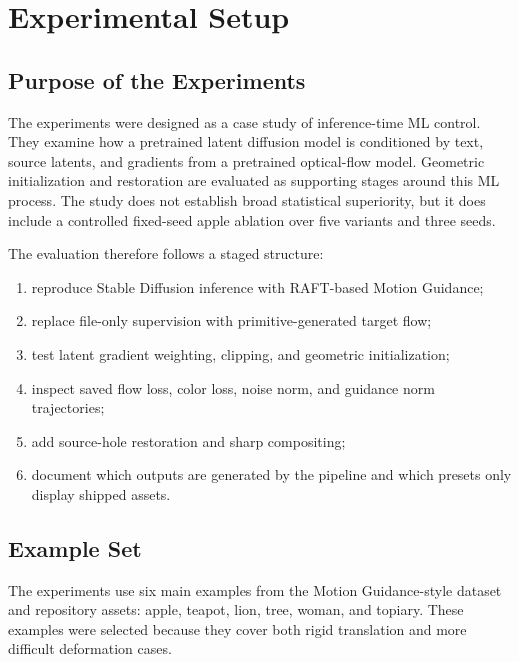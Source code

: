 \setlength{\footskip}{8mm}

\chapter{Experimental Setup}
\label{ch:experimental-setup}

\section{Purpose of the Experiments}

The experiments were designed as a case study of inference-time ML control. They examine how a pretrained latent diffusion model is conditioned by text, source latents, and gradients from a pretrained optical-flow model. Geometric initialization and restoration are evaluated as supporting stages around this ML process. The study does not establish broad statistical superiority, but it does include a controlled fixed-seed apple ablation over five variants and three seeds.

The evaluation therefore follows a staged structure:

\begin{enumerate}
  \item reproduce Stable Diffusion inference with RAFT-based Motion Guidance;
  \item replace file-only supervision with primitive-generated target flow;
  \item test latent gradient weighting, clipping, and geometric initialization;
  \item inspect saved flow loss, color loss, noise norm, and guidance norm trajectories;
  \item add source-hole restoration and sharp compositing;
  \item document which outputs are generated by the pipeline and which presets only display shipped assets.
\end{enumerate}

\section{Example Set}

The experiments use six main examples from the Motion Guidance-style dataset and repository assets: apple, teapot, lion, tree, woman, and topiary. These examples were selected because they cover both rigid translation and more difficult deformation cases.

